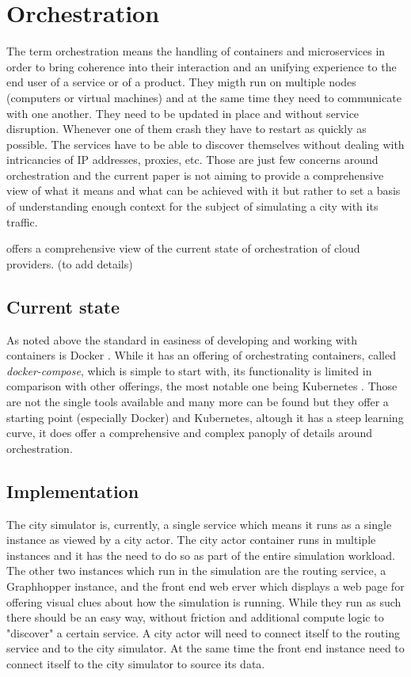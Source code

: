 \documentclass[conference]{IEEEtran}
\begin{document}
\section{Orchestration}
\label{sec:orchestration}

The term orchestration means the handling of containers and microservices in order to bring coherence into their interaction and an unifying experience to the end user of a service or of a product. They migth run on multiple nodes (computers or virtual machines) and at the same time they need to communicate with one another. They need to be updated in place and without service disruption. Whenever one of them crash they have to restart as quickly as possible. The services have to be able to discover themselves without dealing with intricancies of IP addresses, proxies, etc. Those are just few concerns around orchestration and the current paper is not aiming to provide a comprehensive view of what it means and what can be achieved with it but rather to set a basis of understanding enough context for the subject of simulating a city with its traffic.

\cite{7922500} offers a comprehensive view of the current state of orchestration of cloud providers. (to add details)

\subsection{Current state}

As noted above the standard in easiness of developing and working with containers is Docker \cite{docker}. While it has an offering of orchestrating containers, called \textit{docker-compose}, which is simple to start with, its functionality is limited in comparison with other offerings, the most notable one being Kubernetes \cite{Kubernetes}. Those are not the single tools available and many more can be found but they offer a starting point (especially Docker) and Kubernetes, altough it has a steep learning curve, it does offer a comprehensive and complex panoply of details around orchestration.

\subsection{Implementation}

The city simulator is, currently, a single service which means it runs as a single instance as viewed by a city actor. The city actor container runs in multiple instances and it has the need to do so as part of the entire simulation workload. The other two instances which run in the simulation are the routing service, a Graphhopper instance, and the front end web erver which displays a web page for offering visual clues about how the simulation is running. While they run as such there should be an easy way, without friction and additional compute logic to "discover" a certain service. A city actor will need to connect itself to the routing service and to the city simulator. At the same time the front end instance need to connect itself to the city simulator to source its data.
\end{document}
